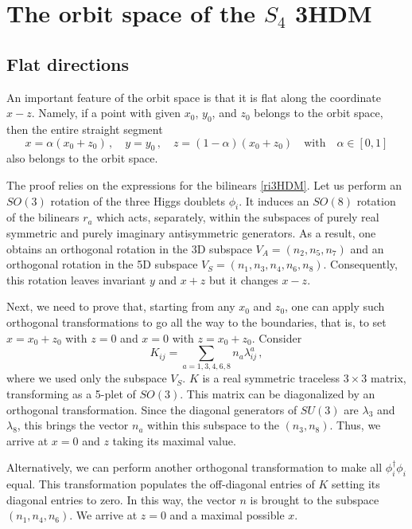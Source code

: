 \documentclass[11pt]{article}
\begin{document}
\section{The orbit space of the $S_4$ 3HDM}\label{appendix:S4}

\subsection{Flat directions}\label{appendix:S4.flat}

An important feature of the orbit space is that it is flat along the coordinate $x-z$.
Namely, if a point with given $x_0$, $y_0$, and $z_0$ belongs to the orbit space, then
the entire straight segment 
\begin{equation}
x = \alpha(x_0 +z_0)\,,\quad y = y_0\,,\quad z= (1-\alpha)(x_0 +z_0)\quad \mbox{with} \quad \alpha \in [0,1]
\end{equation}
also belongs to the orbit space. 

The proof relies on the expressions for the bilinears \eqref{ri3HDM}.
Let us perform an $SO(3)$ rotation of the three Higgs doublets $\phi_i$.
It induces an $SO(8)$ rotation of the bilinears $r_a$ which acts,
separately, within the subspaces of purely real symmetric and purely imaginary antisymmetric generators.
As a result, one obtains an orthogonal rotation in the 3D subspace $V_A = (n_2,n_5,n_7)$
and an orthogonal rotation in the 5D subspace $V_S = (n_1,n_3,n_4,n_6,n_8)$.
Consequently, this rotation leaves invariant $y$ and $x+z$ but it changes $x-z$.

Next, we need to prove that, starting from any $x_0$ and $z_0$,
one can apply such orthogonal transformations to go all the way to the boundaries, 
that is, to set $x=x_0 + z_0$ with $z = 0$ and $x = 0$ with $z=x_0 + z_0$.
Consider 
\begin{equation}
K_{ij} = \sum_{a=1,3,4,6,8} n_a \lambda^a_{ij}\,,
\end{equation}
where we used only the subspace $V_S$.
$K$ is a real symmetric traceless $3\times 3$ matrix, 
transforming as a 5-plet of $SO(3)$.
This matrix can be diagonalized by an orthogonal transformation.
Since the diagonal generators of $SU(3)$ are $\lambda_3$ and $\lambda_8$, 
this brings the vector $n_a$ within this subspace to the $(n_3, n_8)$.
Thus, we arrive at $x = 0$ and $z$ taking its maximal value.

Alternatively, we can perform another orthogonal transformation 
to make all $\phi_i^\dagger \phi_i$ equal.
This transformation populates the off-diagonal entries of $K$ setting its diagonal entries to zero.
In this way, the vector $n$ is brought to the subspace $(n_1, n_4, n_6)$.
We arrive at $z=0$ and a maximal possible $x$.
\end{document}
